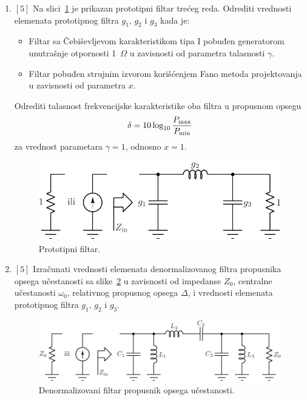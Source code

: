 \documentclass[a4paper]{article}
\begin{document}
\begin{enumerate}


\item $[5]$ Na slici~\ref{fig:filter_prototype} je prikazan prototipni filtar trećeg reda. Odrediti vrednosti elemenata prototipnog filtra $g_1$, $g_2$ i $g_3$ kada je:
\begin{itemize}
\item Filtar sa Čebiševljevom karakteristikom tipa I pobuđen generatorom unutrašnje otpornosti 1~$\Omega$ u zavisnosti od parametra talasnosti $\gamma$.
\item Filtar pobuđen strujnim izvorom korišćenjem Fano metoda projektovanja u zavisnosti od parametra $x$.
\end{itemize} 
Odrediti talasnost frekvencijske karakteristike oba filtra u propusnom opsegu
\begin{equation*}
\delta = 10 \log_{10} \frac{P_{\mathrm{max}}}{P_{\mathrm{min}}}
\end{equation*}
za vrednost parametara $\gamma=1$, odnosno $x=1$.
\begin{figure}[!h]
\begin{center}
\includegraphics[scale=0.75]{fig/prototype.pdf}
\caption{Prototipni filtar.}
\label{fig:filter_prototype}
\end{center}
\end{figure}

\item $[5]$ Izračunati vrednosti elemenata denormalizovanog filtra propusnika opsega učestanosti sa slike~\ref{fig:filter_bandpass} u zavisnosti od impedanse $Z_0$, centralne učestanosti $\omega_0$, relativnog propusnog opsega $\Delta$, i vrednosti elemenata prototipnog filtra $g_1$, $g_2$ i $g_3$.

\begin{figure}[!h]
\begin{center}
\includegraphics[scale=0.75]{fig/bandpass.pdf}
\caption{Denormalizovani filtar propusnik opsega učestanosti.}
\label{fig:filter_bandpass}
\end{center}
\end{figure}


\end{enumerate}
\end{document}
